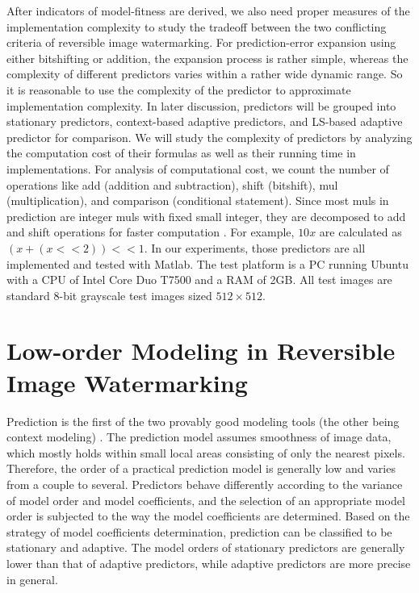 \documentclass[journal]{IEEEtran}
\begin{document}
After indicators of model-fitness are derived, we also need proper measures of the implementation
complexity to study the tradeoff between the two conflicting criteria of reversible image
watermarking. For prediction-error expansion using either bitshifting or addition, the expansion
process is rather simple, whereas the complexity of different predictors varies within a rather wide
dynamic range. So it is reasonable to use the complexity of the predictor to approximate
implementation complexity. In later discussion, predictors will be grouped into stationary
predictors, context-based adaptive predictors, and LS-based adaptive predictor for comparison. We
will study the complexity of predictors by analyzing the computation cost of their formulas as
well as their running time in implementations. For analysis of computational cost, we count the
number of operations like add (addition and subtraction), shift (bitshift), mul (multiplication),
and comparison (conditional statement). Since most muls in prediction are integer muls with fixed
small integer, they are decomposed to add and shift operations for faster computation \cite{Mul}. For
example, $10x$ are calculated as $(x+(x<<2))<<1$. In our experiments, those predictors are all
implemented and tested with Matlab. The test platform is a PC running Ubuntu with a CPU of Intel
Core Duo T7500 and a RAM of 2GB. All test images are standard 8-bit grayscale test images sized $512
\times 512$.

\section{Low-order Modeling in Reversible Image Watermarking}\label{sec:low}

Prediction is the first of the two provably good modeling tools (the other being context modeling)
\cite{Weinberger97}. The prediction model assumes smoothness of image data, which mostly holds
within small local areas consisting of only the nearest pixels. Therefore, the order of a practical
prediction model is generally low and varies from a couple to several. Predictors behave differently
according to the variance of model order and model coefficients, and the selection of an appropriate
model order is subjected to the way the model coefficients are determined. Based on the strategy of
model coefficients determination, prediction can be classified to be stationary and adaptive. The
model orders of stationary predictors are generally lower than that of adaptive predictors, while
adaptive predictors are more precise in general. 
\end{document}
